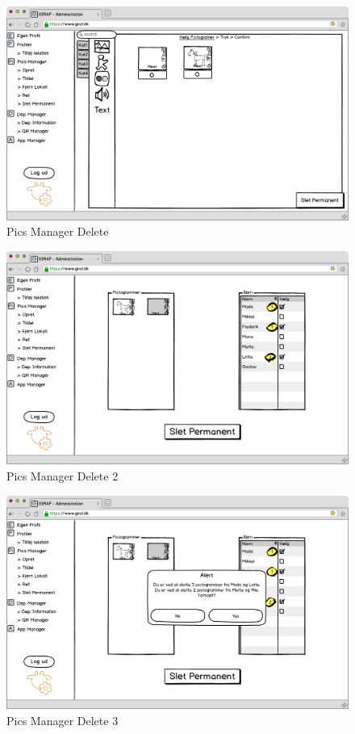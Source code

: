 \newpage

\begin{figure}[p]
\centering
\includegraphics[width=14cm]{images/mockup/picsManagerSlet.png}
\caption{Pics Manager Delete}
\label{fig:pics_manager_delete}
\end{figure}

\begin{figure}[p]
\centering
\includegraphics[width=14cm]{images/mockup/picsManagerSlet2.png}
\caption{Pics Manager Delete 2}
\label{fig:pics_manager_delete2}
\end{figure}

\newpage

\begin{figure}[p]
\centering
\includegraphics[width=14cm]{images/mockup/picsManagerSlet3.png}
\caption{Pics Manager Delete 3}
\label{fig:pics_manager_delete3}
\end{figure}

